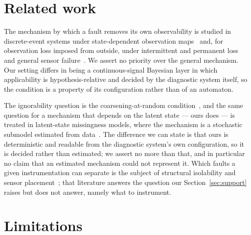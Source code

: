 \documentclass[11pt,a4paper]{article}
\theoremstyle{definition}
\begin{document}
\section{Related work}

The mechanism by which a fault removes its own observability is studied in
discrete-event systems under state-dependent observation
maps~\cite{dong2024statedependent} and, for observation loss imposed from
outside, under intermittent and permanent
loss~\cite{carvalho2012intermittent,carvalho2013permanent} and general sensor
failure~\cite{takai2021diagnosability}. We assert no priority over the general
mechanism. Our setting differs in being a continuous-signal Bayesian layer in
which applicability is hypothesis-relative and decided by the diagnostic system
itself, so the condition is a property of its configuration rather than of an
automaton.

The ignorability question is the coarsening-at-random
condition~\cite{heitjan1991car}, and the same question for a mechanism that
depends on the latent state --- ours does --- is treated in latent-state
missingness models, where the mechanism is a stochastic submodel estimated
from data~\cite{speekenbrink2025statedep}. The difference we can state is that
ours is deterministic and readable from the diagnostic system's own
configuration, so it is decided rather than estimated; we assert no more than
that, and in particular no claim that an estimated mechanism could not
represent it. Which faults a given instrumentation can
separate is the subject of structural isolability and sensor
placement~\cite{krysander2008sensorplacement}; that literature answers the
question our Section~\ref{sec:support} raises but does not answer, namely what
to instrument.

\section{Limitations}
\end{document}
